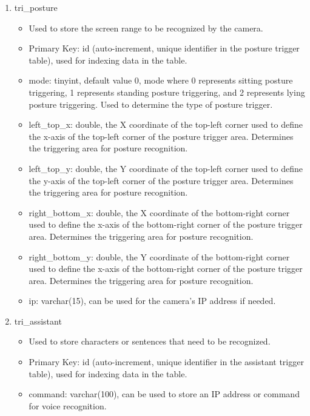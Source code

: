 \begin{enumerate}
\begin{enumerate}
              \item tri\_posture
                    \begin{itemize}
                        \item Used to store the screen range to be recognized by the camera.
                        \item Primary Key: id (auto-increment, unique identifier in the posture trigger table), used for indexing data in the table.
                        \item mode: tinyint, default value 0, mode where 0 represents sitting posture triggering, 1 represents standing posture triggering, and 2 represents lying posture triggering. Used to determine the type of posture trigger.
                        \item left\_top\_x: double, the X coordinate of the top-left corner used to define the x-axis of the top-left corner of the posture trigger area. Determines the triggering area for posture recognition.
                        \item left\_top\_y: double, the Y coordinate of the top-left corner used to define the y-axis of the top-left corner of the posture trigger area. Determines the triggering area for posture recognition.
                        \item right\_bottom\_x: double, the X coordinate of the bottom-right corner used to define the x-axis of the bottom-right corner of the posture trigger area. Determines the triggering area for posture recognition.
                        \item right\_bottom\_y: double, the Y coordinate of the bottom-right corner used to define the x-axis of the bottom-right corner of the posture trigger area. Determines the triggering area for posture recognition.
                        \item ip: varchar(15), can be used for the camera's IP address if needed.\\
                    \end{itemize}

              \item tri\_assistant
                    \begin{itemize}
                        \item Used to store characters or sentences that need to be recognized.
                        \item Primary Key: id (auto-increment, unique identifier in the assistant trigger table), used for indexing data in the table.
                        \item command: varchar(100), can be used to store an IP address or command for voice recognition.\\
                    \end{itemize}


\end{enumerate}
\end{enumerate}

